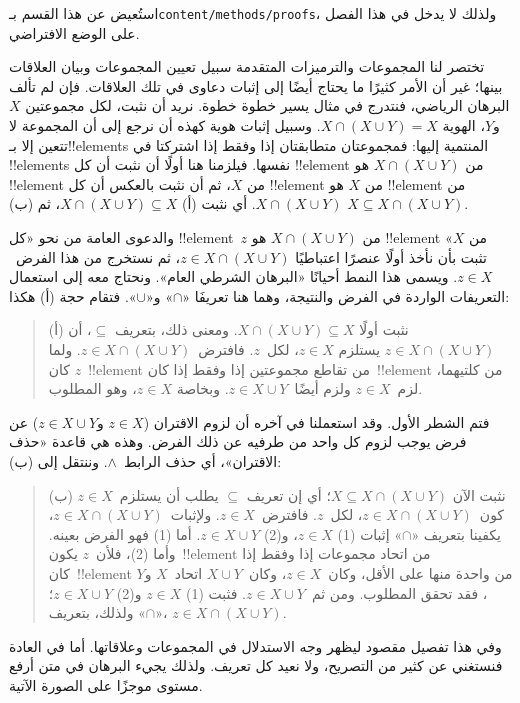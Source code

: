 \documentclass[../../../include/open-logic-section]{subfiles}
\begin{document}

\begin{editorial}
استُعيض عن هذا القسم بـ\verb|content/methods/proofs|، ولذلك لا يدخل في
هذا الفصل على الوضع الافتراضي.
\end{editorial}

\begin{explain}
تختصر لنا المجموعات والترميزات المتقدمة سبيل تعيين المجموعات وبيان
العلاقات بينها؛ غير أن الأمر كثيرًا ما يحتاج أيضًا إلى إثبات دعاوى في
تلك العلاقات. فإن لم تألف البرهان الرياضي، فنتدرج في مثال يسير خطوة
خطوة. نريد أن نثبت، لكل مجموعتين $X$ و$Y$، الهوية
$X \cap (X \cup Y) = X$. وسبيل إثبات هوية كهذه أن نرجع إلى أن المجموعة
لا تتعين إلا بـ!!{element}s المنتمية إليها: فمجموعتان متطابقتان إذا وفقط
إذا اشتركتا في !!{element}s نفسها. فيلزمنا هنا أولًا أن نثبت أن كل
!!{element} من $X \cap (X \cup Y)$ هو !!{element} من $X$، ثم أن نثبت
بالعكس أن كل !!{element} من $X$ هو !!{element} من
$X \cap (X \cup Y)$. أي نثبت (أ)
$X \cap (X \cup Y) \subseteq X$، ثم (ب) $X \subseteq X \cap (X \cup Y)$.

والدعوى العامة من نحو «كل !!{element}~$z$ من $X \cap (X
\cup Y)$ هو !!{element} من $X$» تثبت بأن نأخذ أولًا عنصرًا اعتباطيًا
$z \in X \cap (X \cup Y)$، ثم نستخرج من هذا الفرض~$z \in X$. ويسمى
هذا النمط أحيانًا «البرهان الشرطي العام». ونحتاج معه إلى استعمال
التعريفات الواردة في الفرض والنتيجة، وهما هنا تعريفَا «$\cap$» و«$\cup$».
فتقام حجة (أ) هكذا:

\begin{quote}
(أ) نثبت أولًا $X \cap (X \cup Y) \subseteq X$. ومعنى ذلك، بتعريف
$\subseteq$، أن $z \in X \cap (X \cup Y)$ يستلزم
$z \in X$، لكل~$z$. فافترض~$z \in X \cap (X \cup Y)$. ولما كان
$z$~!!{element} من تقاطع مجموعتين إذا وفقط إذا كان~!!{element} من
  كلتيهما، لزم~$z \in X$ ولزم أيضًا~$z \in X \cup Y$. وبخاصة
$z \in X$، وهو المطلوب.
\end{quote}

فتم الشطر الأول. وقد استعملنا في آخره أن لزوم الاقتران
($z \in X$ و$z \in X \cup Y$) عن فرض يوجب لزوم كل واحد من طرفيه عن
ذلك الفرض. وهذه هي قاعدة «حذف الاقتران»، أي حذف الرابط~$\land$. وننتقل
إلى (ب):

\begin{quote}
(ب) نثبت الآن $X \subseteq X \cap (X \cup Y)$؛ أي إن تعريف
$\subseteq$ يطلب أن يستلزم~$z \in X$ كون~$z \in X \cap
(X \cup Y)$، لكل~$z$. فافترض~$z \in X$. ولإثبات~$z \in X
\cap (X \cup Y)$، يكفينا بتعريف «$\cap$» إثبات (1)
$z \in X$، و(2) $z \in X \cup Y$. أما (1) فهو الفرض بعينه. وأما (2)،
فلأن~$z$ يكون~!!{element} من اتحاد مجموعات إذا وفقط إذا كان~!!{element}
من واحدة منها على الأقل، وكان~$z \in X$، وكان~$X \cup Y$ اتحاد~$X$
و$Y$، فقد تحقق المطلوب. ومن ثم~$z \in X \cup Y$. فثبت (1)
$z \in X$ و(2) $z \in X \cup Y$؛ ولذلك، بتعريف «$\cap$»،
$z \in X \cap (X \cup Y)$.
\end{quote}

وفي هذا تفصيل مقصود ليظهر وجه الاستدلال في المجموعات وعلاقاتها. أما في
العادة فنستغني عن كثير من التصريح، ولا نعيد كل تعريف. ولذلك يجيء البرهان
في متن أرفع مستوى موجزًا على الصورة الآتية.
\end{explain}
\end{document}

